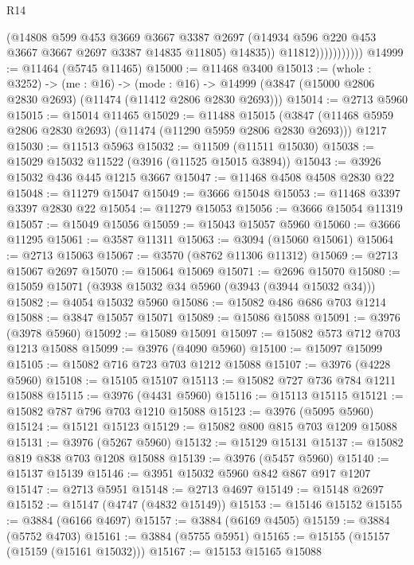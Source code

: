 \begin{lexlean}{R14}
\begin{coremodule}
                            (@14808
                              @599
                              @453
                              @3669
                              @3667
                              @3387
                              @2697
                              (@14934 @596 @220 @453 @3667 @3667 @2697 @3387 @14835 @11805)
                              @14835))
                          @11812)))))))))))
@14999 := @11464 (@5745 @11465)
@15000 := @11468 @3400
@15013 := (whole : @3252) ->
  (me : @16) ->
  (mode : @16) -> @14999 (@3847 (@15000 @2806 @2830 @2693) (@11474 (@11412 @2806 @2830 @2693)))
@15014 := @2713 @5960
@15015 := @15014 @11465
@15029 := @11488
    @15015
    (@3847 (@11468 @5959 @2806 @2830 @2693) (@11474 (@11290 @5959 @2806 @2830 @2693)))
    @1217
@15030 := @11513 @5963
@15032 := @11509 (@11511 @15030)
@15038 := @15029 @15032 @11522 (@3916 (@11525 @15015 @3894))
@15043 := @3926 @15032 @436 @445 @1215 @3667
@15047 := @11468 @4508 @4508 @2830 @22
@15048 := @11279 @15047
@15049 := @3666 @15048
@15053 := @11468 @3397 @3397 @2830 @22
@15054 := @11279 @15053
@15056 := @3666 @15054 @11319
@15057 := @15049 @15056
@15059 := @15043 @15057 @5960
@15060 := @3666 @11295
@15061 := @3587 @11311
@15063 := @3094 (@15060 @15061)
@15064 := @2713 @15063
@15067 := @3570 (@8762 @11306 @11312)
@15069 := @2713 @15067 @2697
@15070 := @15064 @15069
@15071 := @2696 @15070
@15080 := @15059 @15071 (@3938 @15032 @34 @5960 (@3943 (@3944 @15032 @34)))
@15082 := @4054 @15032 @5960
@15086 := @15082 @486 @686 @703 @1214
@15088 := @3847 @15057 @15071
@15089 := @15086 @15088
@15091 := @3976 (@3978 @5960)
@15092 := @15089 @15091
@15097 := @15082 @573 @712 @703 @1213 @15088
@15099 := @3976 (@4090 @5960)
@15100 := @15097 @15099
@15105 := @15082 @716 @723 @703 @1212 @15088
@15107 := @3976 (@4228 @5960)
@15108 := @15105 @15107
@15113 := @15082 @727 @736 @784 @1211 @15088
@15115 := @3976 (@4431 @5960)
@15116 := @15113 @15115
@15121 := @15082 @787 @796 @703 @1210 @15088
@15123 := @3976 (@5095 @5960)
@15124 := @15121 @15123
@15129 := @15082 @800 @815 @703 @1209 @15088
@15131 := @3976 (@5267 @5960)
@15132 := @15129 @15131
@15137 := @15082 @819 @838 @703 @1208 @15088
@15139 := @3976 (@5457 @5960)
@15140 := @15137 @15139
@15146 := @3951 @15032 @5960 @842 @867 @917 @1207
@15147 := @2713 @5951
@15148 := @2713 @4697
@15149 := @15148 @2697
@15152 := @15147 (@4747 (@4832 @15149))
@15153 := @15146 @15152
@15155 := @3884 (@6166 @4697)
@15157 := @3884 (@6169 @4505)
@15159 := @3884 (@5752 @4703)
@15161 := @3884 (@5755 @5951)
@15165 := @15155 (@15157 (@15159 (@15161 @15032)))
@15167 := @15153 @15165 @15088

\end{coremodule}
\end{lexlean}
